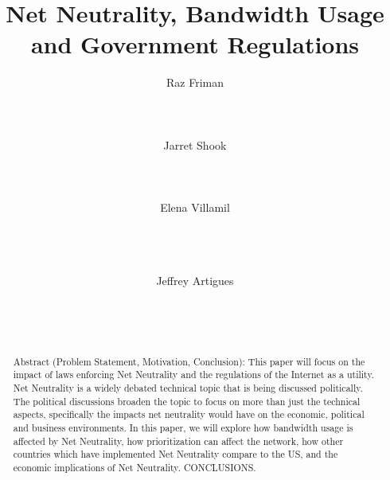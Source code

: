 \documentclass{sigcomm-alternate}
\begin{document}
\title{Net Neutrality, Bandwidth Usage and Government Regulations}
	

\author{
	\alignauthor
	Raz Friman\\
	\\
	\\
	\\
	\alignauthor
	Jarret Shook\\
	\\
	\\
	\\
	\alignauthor Elena Villamil\\
	\\
	\\
	\\
	\and  %
	\alignauthor Jeffrey Artigues\\
	\\
	\\
	\\
}

\maketitle

\begin{abstract}
Abstract (Problem Statement, Motivation, Conclusion): 
This paper will focus on the impact of laws enforcing Net Neutrality and the regulations of the Internet as a utility. Net Neutrality is a widely debated technical topic that is being discussed politically.  The political discussions broaden the topic to focus on more than just the technical aspects, specifically the impacts net neutrality would have on the economic, political and business environments. In this paper, we will explore how bandwidth usage is affected by Net Neutrality, how prioritization can affect the network, how other countries which have implemented Net Neutrality compare to the US, and the economic implications of Net Neutrality. CONCLUSIONS.

\end{abstract}
\end{document}
